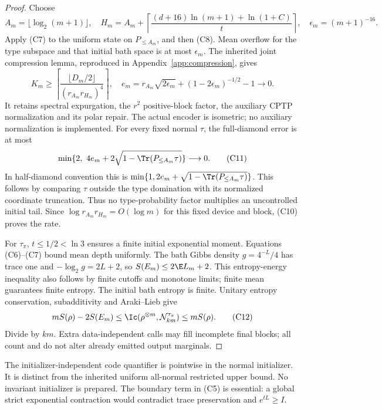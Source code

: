 \begin{proof}
Choose
\[
 A_m=\lfloor\log_2(m+1)\rfloor,\quad
 H_m=A_m+\left\lceil
 \frac{(d+16)\ln(m+1)+\ln(1+C)}t\right\rceil,\quad
 \epsilon_m=(m+1)^{-16}.
 \tag{C9}
\]
Apply (C7) to the uniform state on $P_{\le A_m}$, and then (C8).
Mean overflow for the type subspace and that initial bath space is at
most $\epsilon_m$. The inherited joint compression lemma, reproduced
in Appendix~\ref{app:compression}, gives
\[
 K_m\ge\left\lceil
 \frac{\lfloor D_m/2\rfloor}{(r_{A_m}r_{H_m})^4}
 \right\rceil,\quad
 e_m=r_{A_m}\sqrt{2\epsilon_m}+(1-2\epsilon_m)^{-1/2}-1\to0.
 \tag{C10}
\]
It retains spectral expurgation, the $r^2$ positive-block factor,
the auxiliary CPTP normalization and its polar repair.
The actual encoder is isometric; no auxiliary normalization is implemented.
For every fixed normal $\tau$, the full-diamond error is at most
\[
 \min\{2,\ 4e_m+2\sqrt{1-\Tr(P_{\le A_m}\tau)}\}\longrightarrow0.
 \tag{C11}
\]
In half-diamond convention this is
$\min\{1,2e_m+\sqrt{1-\Tr(P_{\le A_m}\tau)}\}$.
This follows by comparing $\tau$ outside the type domination with its
normalized coordinate truncation. Thus no type-probability factor multiplies
an uncontrolled initial tail. Since $\log r_{A_m}r_{H_m}=O(\log m)$
for this fixed device and block, (C10) proves the rate.

For $\tau_\pi$, $t\le1/2<\ln3$ ensures a finite initial exponential
moment. Equations (C6)--(C7) bound mean depth uniformly. The bath Gibbs
density $g=4^{-L}/4$ has trace one and
$-\log_2g=2L+2$, so $S(E_m)\le2\E L_m+2$.
This entropy-energy inequality also follows by finite cutoffs and monotone
limits; finite mean guarantees finite entropy. The initial bath entropy
is finite. Unitary entropy conservation, subadditivity and Araki--Lieb give
\[
 mS(\rho)-2S(E_m)\le\Ic(\rho^{\otimes m},\mathcal N_{km}^{\tau_\pi})
 \le mS(\rho).
 \tag{C12}
\]
Divide by $km$. Extra data-independent calls may fill incomplete final
blocks; all count and do not alter already emitted output marginals.
\end{proof}

The initializer-independent code quantifier is pointwise in the normal initializer.
It is distinct from the inherited uniform all-normal restricted upper bound.
No invariant initializer is prepared. The boundary term in (C5) is essential:
a global strict exponential contraction would contradict trace preservation
and $e^{tL}\ge I$.

